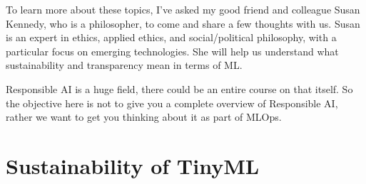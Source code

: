 {{{{{{{{    To learn more about these topics, I’ve asked my good friend and colleague Susan Kennedy, who is a philosopher, to come and share a few thoughts with us. Susan is an expert in ethics, applied ethics, and social/political philosophy, with a particular focus on emerging technologies. She will help us understand what sustainability and transparency mean in terms of ML. 
    

    
    Responsible AI is a huge field, there could be an entire course on that itself. So the objective here is not to give you a complete overview of Responsible AI, rather we want to get you thinking about it as part of MLOps.        
        
\section{Sustainability of TinyML}

}}}}}}}}
